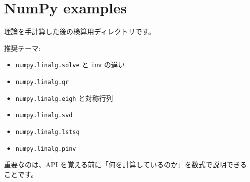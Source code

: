 \documentclass[
  11pt,
  a4paper,
]{ltjsarticle}
\author{}
\date{}
\providecommand{\tightlist}{%
  \setlength{\itemsep}{0pt}\setlength{\parskip}{0pt}}
\begin{document}
\hypertarget{numpy-examples}{%
\section{NumPy examples}\label{numpy-examples}}

理論を手計算した後の検算用ディレクトリです。

推奨テーマ:

\begin{itemize}
\tightlist
\item
  \texttt{numpy.linalg.solve} と \texttt{inv} の違い
\item
  \texttt{numpy.linalg.qr}
\item
  \texttt{numpy.linalg.eigh} と対称行列
\item
  \texttt{numpy.linalg.svd}
\item
  \texttt{numpy.linalg.lstsq}
\item
  \texttt{numpy.linalg.pinv}
\end{itemize}

重要なのは、API
を覚える前に「何を計算しているのか」を数式で説明できることです。
\end{document}
